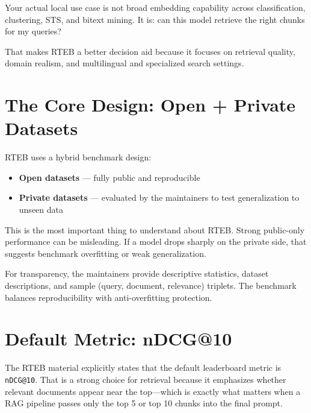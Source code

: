 Your actual local use case is not broad embedding capability across classification, clustering,
STS, and bitext mining. It is: can this model retrieve the right chunks for my queries?

That makes RTEB a better decision aid because it focuses on retrieval quality, domain realism,
and multilingual and specialized search settings.

\section{The Core Design: Open + Private Datasets}

RTEB uses a hybrid benchmark design:

\begin{itemize}
    \item \textbf{Open datasets} --- fully public and reproducible
    \item \textbf{Private datasets} --- evaluated by the maintainers to test generalization
          to unseen data
\end{itemize}

This is the most important thing to understand about RTEB. Strong public-only performance can
be misleading. If a model drops sharply on the private side, that suggests benchmark
overfitting or weak generalization.

For transparency, the maintainers provide descriptive statistics, dataset descriptions, and
sample (query, document, relevance) triplets. The benchmark balances reproducibility with
anti-overfitting protection.

\section{Default Metric: nDCG@10}

The RTEB material explicitly states that the default leaderboard metric is \texttt{nDCG@10}.
That is a strong choice for retrieval because it emphasizes whether relevant documents appear
near the top---which is exactly what matters when a RAG pipeline passes only the top 5 or
top 10 chunks into the final prompt.

